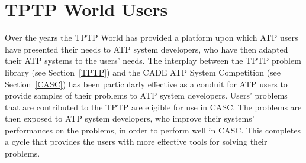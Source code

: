 \documentclass{easychair}
\begin{document}
\section{TPTP World Users}
\label{Users}

Over the years the TPTP World has provided a platform upon which ATP users have presented their 
needs to ATP system developers, who have then adapted their ATP systems to the users’ needs.
The interplay between the TPTP problem library (see Section~\ref{TPTP}) and the CADE ATP
System Competition (see Section~\ref{CASC}) has been particularly effective as a conduit for 
ATP users to provide samples of their problems to ATP system developers.
Users' problems that are contributed to the TPTP are eligible for use in CASC.
The problems are then exposed to ATP system developers, who improve their systems' performances 
on the problems, in order to perform well in CASC.
This completes a cycle that provides the users with more effective tools for solving their 
problems.
\end{document}
